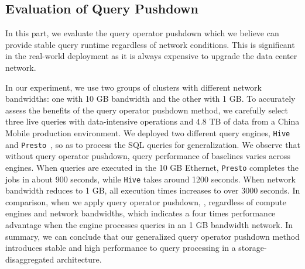 \subsection{Evaluation of Query Pushdown}
In this part, we evaluate the query operator pushdown  which we believe can provide stable query runtime regardless of network conditions. This is significant in the real-world deployment as it is  always expensive to upgrade the data center network. 




In our experiment, we use two groups of clusters with different network bandwidths: one with 10 GB bandwidth and the other with 1 GB. To accurately assess the benefits of the query operator pushdown method, we carefully select three live queries with data-intensive operations and 4.8 TB of data from a China Mobile production environment. We deployed two different query engines, \texttt{Hive}~\cite{} and \texttt{Presto}~\cite{}, so as to process the SQL queries for generalization.
We observe that  without query operator pushdown, query performance of baselines varies  across engines. When  queries are executed in the 10 GB Ethernet, \texttt{Presto} completes the jobs in about 900 seconds, while \texttt{Hive} takes around 1200 seconds. When network bandwidth reduces to 1 GB, all execution times increases to over 3000 seconds.
 In comparison, when we apply query operator pushdown, , regardless of compute engines and network bandwidths, which indicates a four times performance advantage when the engine processes queries in an 1 GB bandwidth network.  In summary, we can conclude that our generalized query operator pushdown method introduces stable and high performance to query processing in a storage-disaggregated architecture. 



